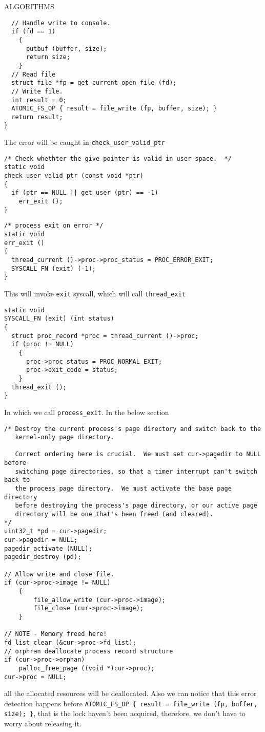 \begin{aspect}{ALGORITHMS}
\begin{lstlisting}
  // Handle write to console.
  if (fd == 1)
    {
      putbuf (buffer, size);
      return size;
    }
  // Read file
  struct file *fp = get_current_open_file (fd);
  // Write file.
  int result = 0;
  ATOMIC_FS_OP { result = file_write (fp, buffer, size); }
  return result;
}
\end{lstlisting}
The error will be caught in \lstinline{check_user_valid_ptr}
\begin{lstlisting}
/* Check whethter the give pointer is valid in user space.  */
static void
check_user_valid_ptr (const void *ptr)
{
  if (ptr == NULL || get_user (ptr) == -1)
    err_exit ();
}
\end{lstlisting}
\begin{lstlisting}
/* process exit on error */
static void
err_exit ()
{
  thread_current ()->proc->proc_status = PROC_ERROR_EXIT;
  SYSCALL_FN (exit) (-1);
}
\end{lstlisting}
This will invoke \lstinline{exit} syscall, which will call \lstinline{thread_exit}
\begin{lstlisting}
static void
SYSCALL_FN (exit) (int status)
{
  struct proc_record *proc = thread_current ()->proc;
  if (proc != NULL)
    {
      proc->proc_status = PROC_NORMAL_EXIT;
      proc->exit_code = status;
    }
  thread_exit ();
}
\end{lstlisting}
In which we call \lstinline{process_exit}. In the below section
\begin{lstlisting}
/* Destroy the current process's page directory and switch back to the
   kernel-only page directory.

   Correct ordering here is crucial.  We must set cur->pagedir to NULL before
   switching page directories, so that a timer interrupt can't switch back to
   the process page directory.  We must activate the base page directory
   before destroying the process's page directory, or our active page
   directory will be one that's been freed (and cleared).
*/
uint32_t *pd = cur->pagedir;
cur->pagedir = NULL;
pagedir_activate (NULL);
pagedir_destroy (pd);

// Allow write and close file.
if (cur->proc->image != NULL)
	{
		file_allow_write (cur->proc->image);
		file_close (cur->proc->image);
	}

// NOTE - Memory freed here!
fd_list_clear (&cur->proc->fd_list);
// orphran deallocate process record structure
if (cur->proc->orphan)
	palloc_free_page ((void *)cur->proc);
cur->proc = NULL;
\end{lstlisting}
all the allocated resources will be deallocated. Also we can notice that this error detection happens before \lstinline|ATOMIC_FS_OP { result = file_write (fp, buffer, size); }|, that is the lock haven't been acquired, therefore, we don't have to worry about releasing it.
\end{aspect}

